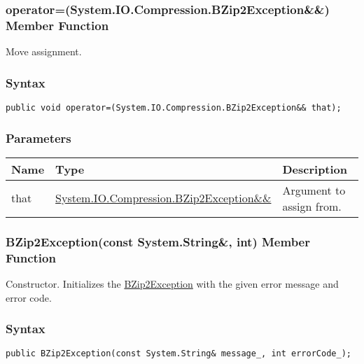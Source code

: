 \documentclass[a4paper,oneside,11.000000pt]{book}
\begin{document}
\hypertarget{System.IO.Compression.BZip2Exception.operator.assign.P.System.IO.Compression.BZip2Exception.RR.System.IO.Compression.BZip2Exception}{\subsubsection*{operator=(System.IO.Compression.BZip2Exception\&\&) Member Function}}\begin{flushleft}
Move assignment.

\end{flushleft}
\subsubsection*{Syntax}
\texttt{public void operator=(System.IO.Compression.BZip2Exception\&\& that);}
\subsubsection*{Parameters}
\begin{flushleft}
\begin{supertabular}[l]{!{\raggedright}p{1.30721cm}!{\raggedright}p{8.55945cm}!{\raggedright}p{4.93333cm}}
\textbf{Name}
& \textbf{Type}
& \textbf{Description}
\\
\hline
that
& \hyperlink{System.IO.Compression.BZip2Exception}{System.\-IO.\-Compression.\-BZip2Exception\&\-\&\-}
& Argument to assign from.

\\
\end{supertabular}

\end{flushleft}
\clearpage

\hypertarget{System.IO.Compression.BZip2Exception.constructor.P.System.IO.Compression.BZip2Exception.C.R.System.String.int}{\subsubsection*{BZip2Exception(const System.String\&, int) Member Function}}
\begin{flushleft}
Constructor. Initializes the \hyperlink{System.IO.Compression.BZip2Exception}{BZip2Exception} with the given error message and error code.

\end{flushleft}
\subsubsection*{Syntax}
\texttt{public BZip2Exception(const System.String\& message\_, int errorCode\_);}
\end{document}
